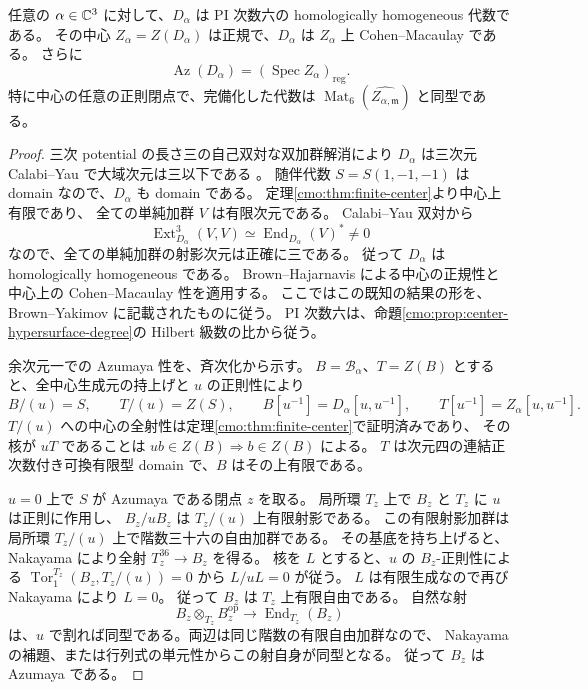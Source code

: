 \begin{theorem}
\label{cmo:thm:azumaya-regular}
任意の $\alpha\in\mathbb C^3$ に対して、$D_\alpha$ は PI 次数六の
homologically homogeneous 代数である。
その中心 $Z_\alpha=Z(D_\alpha)$ は正規で、$D_\alpha$ は
$Z_\alpha$ 上 Cohen--Macaulay である。
さらに
\[
 \operatorname{Az}(D_\alpha)=
       (\operatorname{Spec} Z_\alpha)_{\mathrm{reg}}.
\]
特に中心の任意の正則閉点で、完備化した代数は
$\operatorname{Mat}_6(\widehat{Z_{\alpha,\mathfrak m}})$ と同型である。
\end{theorem}
\begin{proof}
三次 potential の長さ三の自己双対な双加群解消により
$D_\alpha$ は三次元 Calabi--Yau で大域次元は三以下である
\cite[Theorem~3.3.2]{NFMEG}。
随伴代数 $S=S(1,-1,-1)$ は domain なので、$D_\alpha$ も domain である。
定理\ref{cmo:thm:finite-center}より中心上有限であり、
全ての単純加群 $V$ は有限次元である。
Calabi--Yau 双対から
\[
 \operatorname{Ext}_{D_\alpha}^3(V,V)
       \simeq\operatorname{End}_{D_\alpha}(V)^*\ne0
\]
なので、全ての単純加群の射影次元は正確に三である。
従って $D_\alpha$ は homologically homogeneous である。
Brown--Hajarnavis による中心の正規性と中心上の Cohen--Macaulay 性を適用する。
ここではこの既知の結果の形を、
Brown--Yakimov \cite[\S3.8(b)(i), Proposition~3.10 and its proof]{CMOBrownYakimov}
に記載されたものに従う。
PI 次数六は、命題\ref{cmo:prop:center-hypersurface-degree}の Hilbert 級数の比から従う。

余次元一での Azumaya 性を、斉次化から示す。
$B=\mathcal B_\alpha$、$T=Z(B)$ とすると、全中心生成元の持上げと
$u$ の正則性により
\[
 B/(u)=S,\qquad T/(u)=Z(S),\qquad
 B[u^{-1}]=D_\alpha[u,u^{-1}],\qquad
 T[u^{-1}]=Z_\alpha[u,u^{-1}].
\]
$T/(u)$ への中心の全射性は定理\ref{cmo:thm:finite-center}で証明済みであり、
その核が $uT$ であることは $ub\in Z(B)\Rightarrow b\in Z(B)$ による。
$T$ は次元四の連結正次数付き可換有限型 domain で、$B$ はその上有限である。

$u=0$ 上で $S$ が Azumaya である閉点 $z$ を取る。
局所環 $T_z$ 上で $B_z$ と $T_z$ に $u$ は正則に作用し、
$B_z/uB_z$ は $T_z/(u)$ 上有限射影である。
この有限射影加群は局所環 $T_z/(u)$ 上で階数三十六の自由加群である。
その基底を持ち上げると、Nakayama により全射 $T_z^{36}\to B_z$ を得る。
核を $L$ とすると、$u$ の $B_z$-正則性による
$\operatorname{Tor}_1^{T_z}(B_z,T_z/(u))=0$ から $L/uL=0$ が従う。
$L$ は有限生成なので再び Nakayama により $L=0$。
従って $B_z$ は $T_z$ 上有限自由である。
自然な射
\[
 B_z\otimes_{T_z}B_z^{\mathrm{op}}
       \longrightarrow\operatorname{End}_{T_z}(B_z)
\]
は、$u$ で割れば同型である。両辺は同じ階数の有限自由加群なので、
Nakayama の補題、または行列式の単元性からこの射自身が同型となる。
従って $B_z$ は Azumaya である。


\end{proof}
